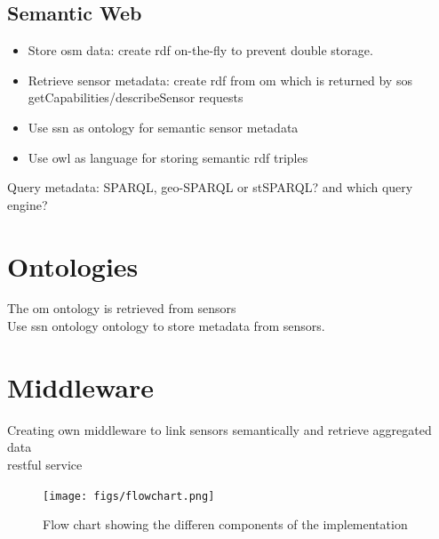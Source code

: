 \subsection{Semantic Web}

\begin{itemize}
	\item Store \ac{osm} data: create \ac{rdf} on-the-fly to prevent double storage. 
	\item Retrieve sensor metadata: create \ac{rdf} from \ac{om} which is returned by \ac{sos} getCapabilities/describeSensor requests
	\item Use \ac{ssn} as ontology for semantic sensor metadata 
	\item Use \ac{owl} as language for storing semantic \ac{rdf} triples
\end{itemize}


Query metadata: SPARQL, geo-SPARQL or stSPARQL? and which query engine?

\section{Ontologies}
The \ac{om} ontology is retrieved from sensors\\
Use \ac{ssn} ontology ontology to store metadata from sensors.  

\section{Middleware}
Creating own middleware to link sensors semantically and retrieve aggregated data\\

\ac{rest}ful service

\begin{figure}
	\centering
	\texttt{[image: figs/flowchart.png]}
	\caption{Flow chart showing the differen components of the implementation}
	\label{fig:Flowchart}
\end{figure}
\fi




